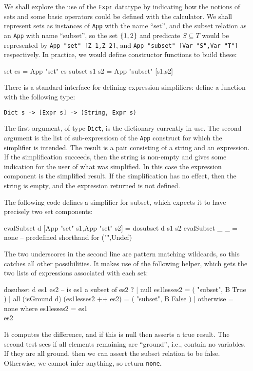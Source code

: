 We shall explore the use of the \texttt{Expr}  datatype
by indicating how the notions of sets and some basic operators
could be defined with the calculator.
We shall represent sets as instances of \texttt{App} with the name ``set'',
and the subset relation as an \texttt{App} with name ``subset'',
so the set $\{{1,2}\}$  and predicate $S \subseteq T$
would be represented by
\verb$App "set" [Z 1,Z 2]$,
and
\verb$App "subset" [Var "S",Var "T"]$ respectively.
In practice, we would define constructor functions to build
these:
\begin{code}
set es = App "set" es
subset s1 s2 = App "subset" [s1,s2]
\end{code}
There is a standard interface for defining expression simplifiers:
define a function with the following type:
\begin{verbatim}
Dict s -> [Expr s] -> (String, Expr s)
\end{verbatim}
The first argument, of type \texttt{Dict},
is the dictionary currently in use.
The second argument is the list of sub-expressiosn of
the \texttt{App} construct for which the simplifier is intended.
The result is a pair consisting of a string and an expression.
If the simplification succeeds, then the string is non-empty
and gives some indication for the user
of what was simplified.
In this case the expression component is the simplified result.
If the simplification has no effect, then the string is empty,
and the expression returned is not defined.

The following code defines a simplifier for subset,
which expects it to have precisely two set components:
\begin{code}
evalSubset d [App "set" s1,App "set" s2] = dosubset d s1 s2
evalSubset _ _ = none -- predefined shorthand for ("",Undef)
\end{code}
The two underscores in the second line are pattern matching
wildcards, so this catches all other possibilities.
It makes use of the following helper,
which gets the two lists of expressions associated with each set:
\begin{code}
dosubset d es1 es2 -- is es1 a subset of es2 ?
  | null es1lesses2  =  ( "subset", B True )
  | all (isGround d) (es1lesses2 ++ es2)
                     =  ( "subset", B False )
  | otherwise        =  none
  where es1lesses2 = es1 \\ es2
\end{code}
It computes the difference,
and if this is null then asserts a true result.
The second test sees if all elements remaining are ``ground'',
i.e., contain no variables.
If they are all ground, then we can assert the subset relation
to be false.
Otherwise, we cannot infer anything, so return \texttt{none}.

